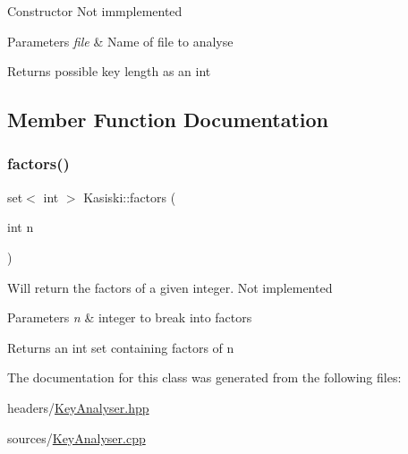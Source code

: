 Constructor Not immplemented


\begin{DoxyParams}{Parameters}
{\em file} & Name of file to analyse \\
\hline
\end{DoxyParams}
\begin{DoxyReturn}{Returns}
possible key length as an int 
\end{DoxyReturn}


\subsection{Member Function Documentation}
\mbox{\label{classKasiski_a82de87eb81569e3d8d595560fa73ee6a}} 
\subsubsection{\texorpdfstring{factors()}{factors()}}
{\footnotesize\ttfamily set$<$ int $>$ Kasiski\+::factors (\begin{DoxyParamCaption}\item[{int}]{n }\end{DoxyParamCaption})}

Will return the factors of a given integer. Not implemented


\begin{DoxyParams}{Parameters}
{\em n} & integer to break into factors \\
\hline
\end{DoxyParams}
\begin{DoxyReturn}{Returns}
an int set containing factors of n 
\end{DoxyReturn}


The documentation for this class was generated from the following files\+:\begin{DoxyCompactItemize}
\item 
headers/\hyperlink{KeyAnalyser_8hpp}{Key\+Analyser.\+hpp}\item 
sources/\hyperlink{KeyAnalyser_8cpp}{Key\+Analyser.\+cpp}\end{DoxyCompactItemize}

